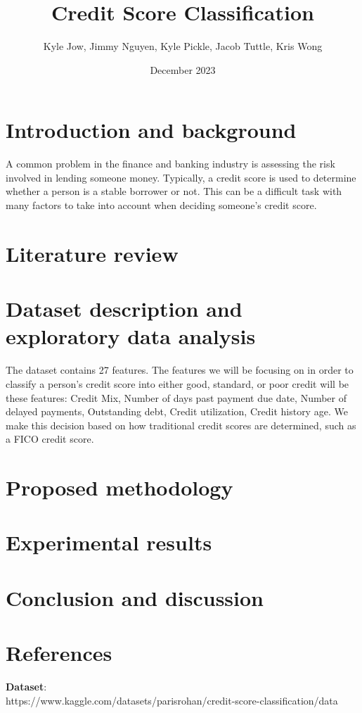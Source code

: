 \documentclass{article}
\title{\textbf{Credit Score Classification}}
\author{Kyle Jow, Jimmy Nguyen, Kyle Pickle, Jacob Tuttle, Kris Wong}
\date{December 2023}
\begin{document}
\maketitle
\newpage
{}
\pagestyle{fancy}
\fancyhf{} %
\fancyfoot[R]{\thepage}
\section*{Introduction and background}
A common problem in the finance and banking industry is assessing the risk 
involved in lending someone money. Typically, a credit score is used to determine 
whether a person is a stable borrower or not. This can be a difficult task with 
many factors to take into account when deciding someone's credit score.
\newpage
\section*{Literature review}

\newpage
\section*{Dataset description and exploratory data analysis}
The dataset contains 27 features. The features we will be focusing on in order
to classify a person's credit score into either good, standard, or poor credit
will be these features: Credit Mix, Number of days past payment due date, Number
of delayed payments, Outstanding debt, Credit utilization, Credit history age.
We make this decision based on how traditional credit scores are determined,
such as a FICO credit score.
\newpage
\section*{Proposed methodology}

\newpage
\section*{Experimental results}

\newpage
\section*{Conclusion and discussion}

\newpage
\section*{References}
\textbf{Dataset}:\\
https://www.kaggle.com/datasets/parisrohan/credit-score-classification/data
\end{document}
